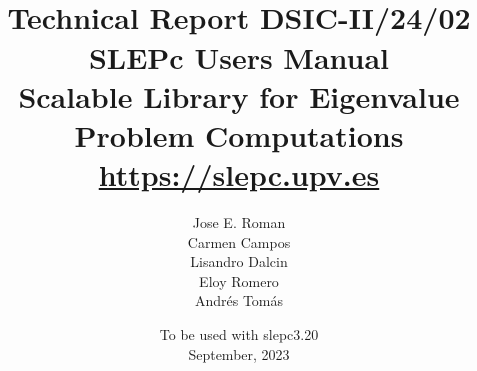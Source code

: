 \documentclass[titlepage,10pt,a4paper]{book}
\newcommand{\slepcversion}{3.20}
\newcommand{\slepchome}{https://slepc.upv.es}
\newcommand{\packnoi}[1]{{\sc #1}\xspace}
\newcommand{\slepc}{\texorpdfstring{\packnoi{slep\rm c}}{{SLEPc}}}
\begin{document}
\title{
 	\vspace*{-1cm}
	\\[2cm]
	\normalsize Technical Report DSIC-II/24/02
	\\[2cm]
	\vspace*{6mm}
	{\Large\bf\sffamily
	SLEPc Users Manual\\[2mm]}
	{\large\bf\sffamily
	Scalable Library for Eigenvalue Problem Computations}\\[2mm]
	\vspace*{6mm}
	\vspace*{6mm}
	\url{\slepchome}
	\\[6mm]
}

\author{
  Jose E. Roman\\
  Carmen Campos\\
  Lisandro Dalcin\\
  Eloy Romero\\
  Andr\'es Tom\'as\\[3mm]
}

\date{
	To be used with \slepc \slepcversion\\
	September, 2023
}

\hypersetup{pageanchor=false}
\begin{titlepage}
\maketitle
\end{titlepage}

\setlength{\textheight}{18cm}
\setlength{\oddsidemargin}{0.6cm}
\setlength{\evensidemargin}{0.6cm}
\setlength{\footskip}{2cm}
\setlength{\voffset}{1.3cm}
\end{document}
